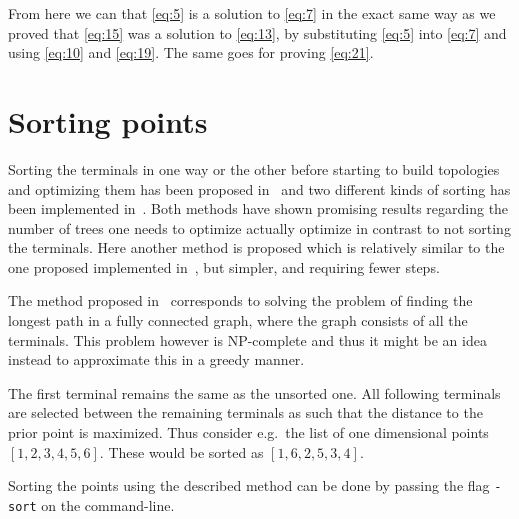 %
From here we can that \cref{eq:5} is a solution to \cref{eq:7} in the exact same way as
we proved that \cref{eq:15} was a solution to \cref{eq:13}, by substituting
\cref{eq:5} into \cref{eq:7} and using \cref{eq:10} and \cref{eq:19}. The same
goes for proving \cref{eq:21}.

\section{Sorting points}
\label{sec:sorting-points}

Sorting the terminals in one way or the other before starting to build
topologies and optimizing them has been proposed in~\cite{Smith1992} and two
different kinds of sorting has been implemented
in~\cite{Fonseca2015,VanLaarhoven2013}.  Both methods have shown promising
results regarding the number of trees one needs to optimize actually optimize in
contrast to not sorting the terminals. Here another method is
proposed which is relatively similar to the one proposed implemented
in~\cite{Fonseca2015}, but simpler, and requiring fewer steps.

The method proposed in~\cite{Fonseca2015} corresponds to solving the problem of
finding the longest path in a fully connected graph, where the graph consists of
all the terminals.  This problem however is NP-complete\missingref{} and thus
it might be an idea instead to approximate this in a greedy manner.

The first terminal remains the same as the unsorted one.  All following terminals
are selected between the remaining terminals as such that the distance to the
prior point is maximized.  Thus consider e.g.\ the list of one dimensional points
$[1, 2, 3, 4, 5, 6]$.  These would be sorted as $[1, 6, 2, 5, 3, 4]$.

Sorting the points using the described method can be done by passing the flag
\texttt{-sort} on the command-line.

\chapterbreak{}

